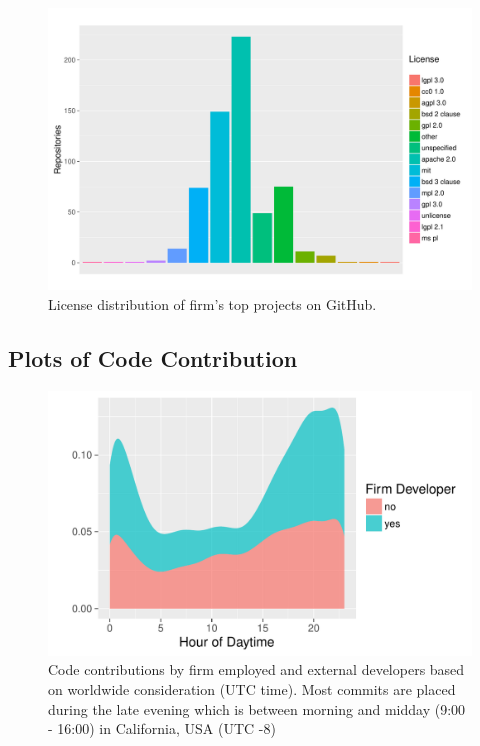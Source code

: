 \begin{figure}[h]
	\centering
	\includegraphics[page=1,scale=0.35]{../graphics/intro/licenses/popular_licenses_top.pdf}
	\caption{License distribution of firm's top projects on GitHub.}
	\label{fig:licenses_in_top_projects}
\end{figure}

\clearpage
\subsection{Plots of Code Contribution}

\begin{figure}[!ht]
	\centering
	\includegraphics[page=1,scale=0.7]{../graphics/intro/hour_of_code_contribution_daytime_worldtime.pdf}
	\caption{Code contributions by firm employed and external developers based on worldwide consideration (UTC time). Most commits are placed during the late evening which is between morning and midday (9:00 - 16:00) in California, USA (UTC -8)}
	\label{fig:distribution_developer_commits_wordlwide}
\end{figure}

